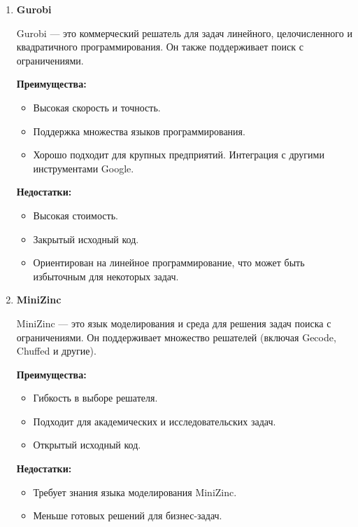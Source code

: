 \begin{enumerate}
\item \noindent \textbf {Gurobi}

Gurobi — это коммерческий решатель для задач линейного, целочисленного и квадратичного программирования. Он также поддерживает поиск с ограничениями.
\vspace{6mm}

\noindent \textbf{Преимущества:}
\begin{itemize}
    \item Высокая скорость и точность.
    \item Поддержка множества языков программирования.
    \item Хорошо подходит для крупных предприятий.
Интеграция с другими инструментами Google.
\end{itemize}

\vspace{6mm}

\noindent \textbf{Недостатки:}
\begin{itemize}
\item Высокая стоимость.
\item Закрытый исходный код.
\item Ориентирован на линейное программирование, что может быть избыточным для некоторых задач.
\end{itemize}

\vspace{6mm}

\item \noindent \textbf{MiniZinc}

MiniZinc — это язык моделирования и среда для решения задач поиска с ограничениями. Он поддерживает множество решателей (включая Gecode, Chuffed и другие).
\vspace{6mm}

\noindent \textbf{Преимущества:}
\begin{itemize}
    \item Гибкость в выборе решателя.
    \item Подходит для академических и исследовательских задач.
    \item Открытый исходный код.
\end{itemize}

\vspace{6mm}

\noindent \textbf{Недостатки:}
\begin{itemize}
\item Требует знания языка моделирования MiniZinc.
\item Меньше готовых решений для бизнес-задач.
\end{itemize}


\end{enumerate}
